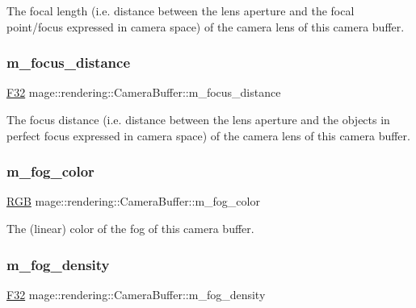The focal length (i.\+e. distance between the lens aperture and the focal point/focus expressed in camera space) of the camera lens of this camera buffer. \mbox{\label{structmage_1_1rendering_1_1_camera_buffer_ac483a3656006290880c1ac9e1039e33e}} 
\subsubsection{\texorpdfstring{m\+\_\+focus\+\_\+distance}{m\_focus\_distance}}
{\footnotesize\ttfamily \mbox{\hyperlink{namespacemage_aa97e833b45f06d60a0a9c4fc22ae02c0}{F32}} mage\+::rendering\+::\+Camera\+Buffer\+::m\+\_\+focus\+\_\+distance}

The focus distance (i.\+e. distance between the lens aperture and the objects in perfect focus expressed in camera space) of the camera lens of this camera buffer. \mbox{\label{structmage_1_1rendering_1_1_camera_buffer_a6f963e7d607c59ab0dfc3972e06a9739}} 
\subsubsection{\texorpdfstring{m\+\_\+fog\+\_\+color}{m\_fog\_color}}
{\footnotesize\ttfamily \mbox{\hyperlink{structmage_1_1_r_g_b}{R\+GB}} mage\+::rendering\+::\+Camera\+Buffer\+::m\+\_\+fog\+\_\+color}

The (linear) color of the fog of this camera buffer. \mbox{\label{structmage_1_1rendering_1_1_camera_buffer_aa9c3a305adfbeb717d480e822ed1c77e}} 
\subsubsection{\texorpdfstring{m\+\_\+fog\+\_\+density}{m\_fog\_density}}
{\footnotesize\ttfamily \mbox{\hyperlink{namespacemage_aa97e833b45f06d60a0a9c4fc22ae02c0}{F32}} mage\+::rendering\+::\+Camera\+Buffer\+::m\+\_\+fog\+\_\+density}

